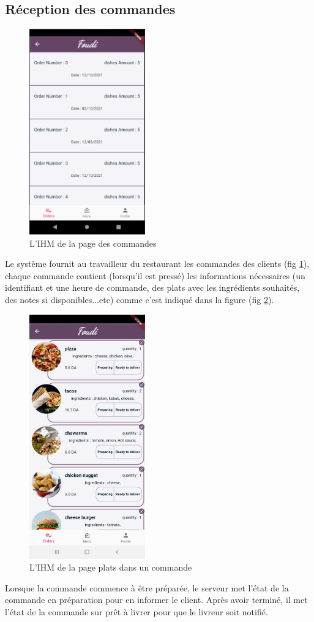 \documentclass[french, a4paper, 12pt]{report}
\begin{document}
		\subsection{Réception des commandes}
		
		\begin{figure}[h!]
			\center
			\includegraphics[width=5cm]{screenshots/Restaurantviews/ListofOrders(received).png}
			\caption{L'IHM de la page des commandes}
			\label{fig:restord}	
		\end{figure} Le système fournit au travailleur du restaurant les commandes des clients (fig \ref{fig:restord}), chaque commande contient (lorsqu'il est pressé) les informations nécessaires (un identifiant et une heure de commande, des plats avec les ingrédients souhaités, des notes si disponibles...etc) comme c'est indiqué dans  la figure (fig \ref{fig:restdish}).
		
		\newpage
		\begin{figure}[h!]
			\center
			\includegraphics[width=5cm]{screenshots/Restaurantviews/ListofDishes.jpg}
			\caption{L'IHM de la page plats dans un commande}
			\label{fig:restdish}	
		\end{figure}
		Lorsque la commande commence à être préparée, le serveur met l'état de la commande en préparation pour en informer le client. Après avoir terminé, il met l'état de la commande sur prêt à livrer pour que le livreur soit notifié.
		
\end{document}

